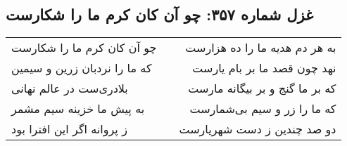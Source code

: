 \begin{center}
\section*{غزل شماره ۳۵۷: چو آن کان کرم ما را شکارست}
\label{sec:0357}
\begin{longtable}{l p{0.5cm} r}
چو آن کان کرم ما را شکارست
&&
به هر دم هدیه ما را ده هزارست
\\
که ما را نردبان زرین و سیمین
&&
نهد چون قصد ما بر بام یارست
\\
بلادری‌ست در عالم نهانی
&&
که بر ما گنج و بر بیگانه مارست
\\
به پیش ما خزینه سیم مشمر
&&
که ما را زر و سیم بی‌شمارست
\\
ز پروانه اگر این افترا بود
&&
دو صد چندین ز دست شهریارست
\\
\end{longtable}
\end{center}
